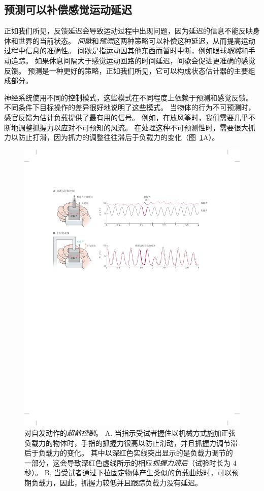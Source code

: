 \subsection{预测可以补偿感觉运动延迟}

正如我们所见，反馈延迟会导致运动过程中出现问题，因为延迟的信息不能反映身体和世界的当前状态。
\textit{间歇}和\textit{预测}这两种策略可以补偿这种延迟，从而提高运动过程中信息的准确性。
间歇是指运动因其他东西而暂时中断，例如眼球\textit{眼跳}和手动追踪。
如果休息间隔大于感觉运动回路的时间延迟，间歇会促进更准确的感觉反馈。
预测是一种更好的策略，正如我们所见，它可以构成状态估计器的主要组成部分。


神经系统使用不同的控制模式，这些模式在不同程度上依赖于预测和感觉反馈。
不同条件下目标操作的差异很好地说明了这些模式。
当物体的行为不可预测时，感官反馈为估计负载提供了最有用的信号。
例如，在放风筝时，我们需要几乎不断地调整抓握力以应对不可预知的风流。 
在处理这种不可预测性时，需要很大抓力以防止打滑，因为抓力的调整往往滞后于负载力的变化（图~\ref{fig:30_6}A）。


\begin{figure}[htbp]
	\centering
	\includegraphics[width=1.0\linewidth]{chap30/fig_30_6}
	\caption{对自发动作的\textit{超前控制}\cite{blakemore1998predicting}。
		A. 当指示受试者握住以机械方式施加正弦负载力的物体时，手指的抓握力很高以防止滑动，并且抓握力调节滞后于负载力的变化。
		其中以深红色实线突出显示的是负载力调节的一部分，这会导致深红色虚线所示的相应\textit{抓握力滞后}（试验时长为 4 秒）。
		B. 当受试者通过下拉固定物体产生类似的负载曲线时，可以预期负载力，因此，抓握力较低并且跟踪负载力没有延迟。}
	\label{fig:30_6}
\end{figure}



